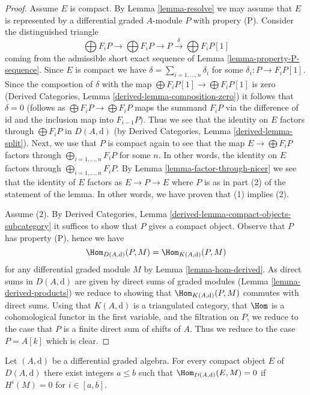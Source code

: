 \begin{proof}
Assume $E$ is compact. By Lemma \ref{lemma-resolve} we may assume that $E$
is represented by a differential graded $A$-module $P$ with propery (P).
Consider the distinguished triangle
$$
\bigoplus F_iP \to \bigoplus F_iP \to P
\xrightarrow{\delta} \bigoplus F_iP[1]
$$
coming from the admissible short exact sequence of
Lemma \ref{lemma-property-P-sequence}. Since $E$ is compact we have
$\delta = \sum_{i = 1, \ldots, n} \delta_i$ for some
$\delta_i : P \to F_iP[1]$. Since the compostion of $\delta$
with the map $\bigoplus F_iP[1] \to \bigoplus F_iP[1]$ is zero
(Derived Categories, Lemma \ref{derived-lemma-composition-zero})
it follows that $\delta = 0$ (follows as $\bigoplus F_iP \to \bigoplus F_iP$
maps the summand $F_iP$ via the difference of $\text{id}$ and the inclusion
map into $F_{i - 1}P$).
Thus we see that the identity on $E$ factors through
$\bigoplus F_iP$ in $D(A, \text{d})$ (by
Derived Categories, Lemma \ref{derived-lemma-split}).
Next, we use that $P$ is compact again to see that the map
$E \to \bigoplus F_iP$ factors through $\bigoplus_{i = 1, \ldots, n} F_iP$
for some $n$. In other words, the identity on $E$ factors through
$\bigoplus_{i = 1, \ldots, n} F_iP$. By
Lemma \ref{lemma-factor-through-nicer}
we see that the identity of $E$ factors as $E \to P \to E$
where $P$ is as in part (2) of the statement of the lemma.
In other words, we have proven that (1) implies (2).

\medskip\noindent
Assume (2). By
Derived Categories, Lemma \ref{derived-lemma-compact-objects-subcategory}
it suffices to show that $P$ gives a compact object. Observe that
$P$ has property (P), hence we have
$$
\Hom_{D(A, \text{d})}(P, M) = \Hom_{K(A, \text{d})}(P, M)
$$
for any differential graded module $M$ by Lemma \ref{lemma-hom-derived}.
As direct sums in $D(A, \text{d})$ are given by direct sums of
graded modules (Lemma \ref{lemma-derived-products}) we reduce
to showing that $\Hom_{K(A, \text{d})}(P, M)$ commutes with direct
sums. Using that $K(A, \text{d})$ is a triangulated category,
that $\Hom$ is a cohomological functor in the first
variable, and the filtration on $P$, we reduce to the case that
$P$ is a finite direct sum of shifts of $A$. Thus we reduce to
the case $P = A[k]$ which is clear.
\end{proof}

\begin{lemma}
\label{lemma-compact-implies-bounded}
Let $(A, \text{d})$ be a differential graded algebra.
For every compact object $E$ of $D(A, \text{d})$ there
exist integers $a \leq b$ such that $\Hom_{D(A, \text{d})}(E, M) = 0$
if $H^i(M) = 0$ for $i \in [a, b]$.
\end{lemma}

